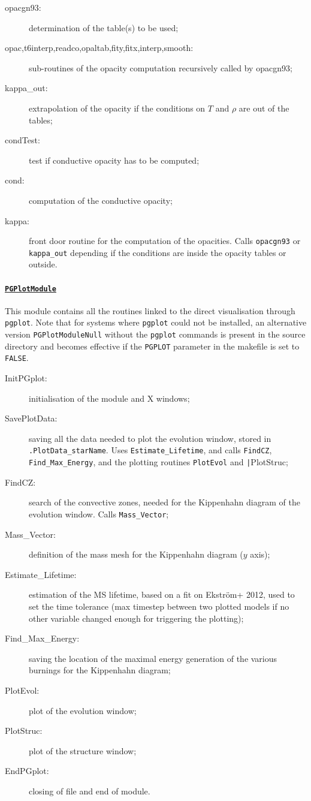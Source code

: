 \documentclass[11pt]{article}
\begin{document}
\begin{description}
 \item[opacgn93:] determination of the table(s) to be used;
 \item[opac,t6interp,readco,opaltab,fity,fitx,interp,smooth:] sub-routines of the opacity computation recursively called by opacgn93;
 \item[kappa\_out:] extrapolation of the opacity if the conditions on $T$ and $\rho$ are out of the tables;
 \item[condTest:] test if conductive opacity has to be computed;
 \item[cond:] computation of the conductive opacity;
 \item[kappa:] front door routine for the computation of the opacities. Calls \texttt{opacgn93} or \texttt{kappa\_out} depending if the conditions are inside the opacity tables or outside.
 \end{description}

\paragraph{\underline{\texttt{PGPlotModule}}}
This module contains all the routines linked to the direct visualisation through \texttt{pgplot}. Note that for systems where \texttt{pgplot} could not be installed, an alternative version \texttt{PGPlotModuleNull} without the \texttt{pgplot} commands is present in the source directory and becomes effective if the \texttt{PGPLOT} parameter in the makefile is set to \texttt{FALSE}.

\begin{description}
  \item[InitPGplot:] initialisation of the module and X windows;
  \item[SavePlotData:] saving all the data needed to plot the evolution window, stored in \texttt{.PlotData\_starName}. Uses \texttt{Estimate\_Lifetime}, and calls \texttt{FindCZ}, \texttt{Find\_Max\_Energy}, and the plotting routines \texttt{PlotEvol} and \texttt|{PlotStruc};
  \item[FindCZ:] search of the convective zones, needed for the Kippenhahn diagram of the evolution window. Calls \texttt{Mass\_Vector};
  \item[Mass\_Vector:] definition of the mass mesh for the Kippenhahn diagram ($y$ axis);
  \item[Estimate\_Lifetime:] estimation of the MS lifetime, based on a fit on Ekstr\"om+ 2012, used to set the time tolerance (max timestep between two plotted models if no other variable changed enough for triggering the plotting);
  \item[Find\_Max\_Energy:] saving the location of the maximal energy generation of the various burnings for the Kippenhahn diagram;
  \item[PlotEvol:] plot of the evolution window;
  \item[PlotStruc:] plot of the structure window;
  \item[EndPGplot:] closing of file and end of module.
\end{description}
\end{document}
